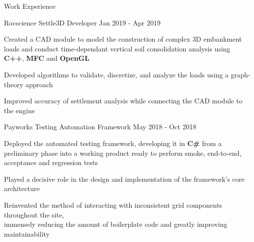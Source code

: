 \documentclass{resume} %
\begin{document}
\begin{rSection}{Work Experience}
    \begin{workexperience}
        {Rocscience}
        {Settle3D Developer}
        {Jan 2019 - Apr 2019}
        {
            \item Created a CAD module to model the construction of complex 3D embankment loads and 
            conduct time-dependant vertical soil consolidation analysis using \textbf{C++}, \textbf{MFC} and \textbf{OpenGL}
            \item Developed algorithms to validate, discretize, and analyze the loads using a graph-theory approach
            \item Improved accuracy of settlement analysis while connecting the CAD module to the engine
        }
    \end{workexperience}
    
    \begin{workexperience}
        {Payworks}
        {Testing Automation Framework}
        {May 2018 - Oct 2018}
        {
            \item Deployed the automated testing framework, developing it in \textbf{C\#} from a preliminary phase into a working product ready to perform smoke, end-to-end, acceptance and regression tests
            \item Played a decisive role in the design and implementation of the framework's core architecture
            \item Reinvented the method of interacting with inconsistent grid components throughout the site, \\immensely reducing the amount of boilerplate code and greatly improving maintainability
        }
    \end{workexperience}

    \vspace{1em}

\end{rSection}


\pagebreak
\end{document}
